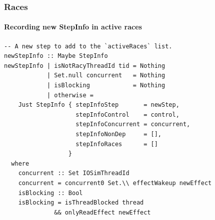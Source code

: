 \documentclass[t,x11names,xcolor={x11names},hyperref={colorlinks,citecolor=Blue4,linkcolor=Blue4,anchorcolor=Blue4,urlcolor=Blue4}]{beamer}
\begin{document}
\begin{frame}[fragile]
  \frametitle{Races}
  \framesubtitle{Recording new StepInfo in active races}

  {\small
  \begin{verbatim}
-- A new step to add to the `activeRaces` list.
newStepInfo :: Maybe StepInfo
newStepInfo | isNotRacyThreadId tid = Nothing
            | Set.null concurrent   = Nothing
            | isBlocking            = Nothing
            | otherwise =
    Just StepInfo { stepInfoStep       = newStep,
                    stepInfoControl    = control,
                    stepInfoConcurrent = concurrent,
                    stepInfoNonDep     = [],
                    stepInfoRaces      = []
                  }
  where
    concurrent :: Set IOSimThreadId
    concurrent = concurrent0 Set.\\ effectWakeup newEffect
    isBlocking :: Bool
    isBlocking = isThreadBlocked thread
              && onlyReadEffect newEffect
  \end{verbatim}
  }
\end{frame}
\end{document}
